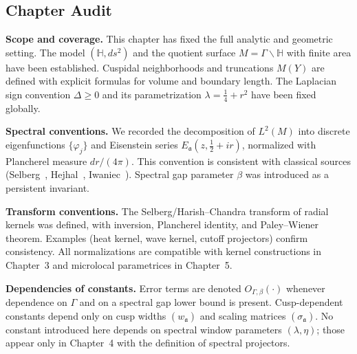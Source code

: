 





\subsection*{Chapter Audit}

\noindent\textbf{Scope and coverage.}  
This chapter has fixed the full analytic and geometric setting.  
The model $(\mathbb{H},ds^{2})$ and the quotient surface $M=\Gamma\backslash\mathbb{H}$ 
with finite area have been established.  
Cuspidal neighborhoods and truncations $M(Y)$ are defined with explicit formulas 
for volume and boundary length.  
The Laplacian sign convention $\Delta\ge 0$ and its parametrization $\lambda=\tfrac14+r^{2}$ 
have been fixed globally.

\medskip
\noindent\textbf{Spectral conventions.}  
We recorded the decomposition of $L^{2}(M)$ into discrete eigenfunctions 
$\{\varphi_{j}\}$ and Eisenstein series $E_{\mathfrak a}(z,\tfrac12+ir)$,  
normalized with Plancherel measure $dr/(4\pi)$.  
This convention is consistent with classical sources (Selberg~\cite{Selberg1956},  
Hejhal~\cite{Hejhal1983}, Iwaniec~\cite{Iwaniec2002}).  
Spectral gap parameter $\beta$ was introduced as a persistent invariant.

\medskip
\noindent\textbf{Transform conventions.}  
The Selberg/Harish–Chandra transform of radial kernels was defined,  
with inversion, Plancherel identity, and Paley–Wiener theorem.  
Examples (heat kernel, wave kernel, cutoff projectors) confirm consistency.  
All normalizations are compatible with kernel constructions in Chapter~3 
and microlocal parametrices in Chapter~5.

\medskip
\noindent\textbf{Dependencies of constants.}  
Error terms are denoted $O_{\Gamma,\beta}(\cdot)$ whenever dependence on $\Gamma$ and on 
a spectral gap lower bound is present.  
Cusp-dependent constants depend only on cusp widths $(w_{\mathfrak{a}})$ and scaling matrices $(\sigma_{\mathfrak{a}})$.  
No constant introduced here depends on spectral window parameters $(\lambda,\eta)$;  
those appear only in Chapter~4 with the definition of spectral projectors.

